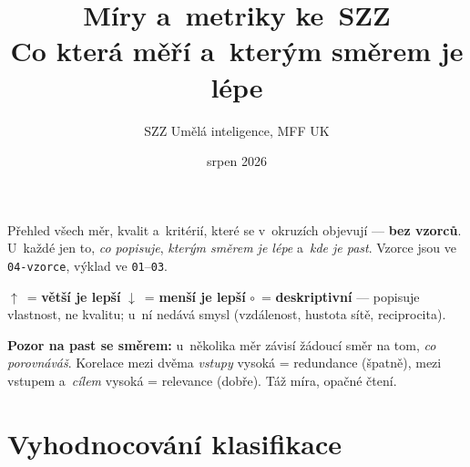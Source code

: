 \documentclass[11pt,a4paper]{article}
\title{\textbf{Míry a~metriky ke~SZZ}\\[2mm]
\large Co která měří a~kterým směrem je lépe}
\author{SZZ Umělá inteligence, MFF UK}
\date{srpen 2026}
\newcommand{\up}{\textcolor{upcol}{$\boldsymbol{\uparrow}$}}
\newcommand{\down}{\textcolor{downcol}{$\boldsymbol{\downarrow}$}}
\newcommand{\neut}{$\circ$}
\begin{document}
\maketitle

\begin{center}
\begin{minipage}{0.93\textwidth}
\small
Přehled všech měr, kvalit a~kritérií, které se v~okruzích objevují --- \textbf{bez vzorců}.
U~každé jen to, \emph{co popisuje}, \emph{kterým směrem je lépe} a~\emph{kde je past}.
Vzorce jsou ve \texttt{04-vzorce}, výklad ve \texttt{01}--\texttt{03}.
\end{minipage}
\end{center}

\begin{center}
\begin{minipage}{0.93\textwidth}
\begin{poznbox}
\small
\up~= \textbf{větší je lepší} \quad\textbullet\quad
\down~= \textbf{menší je lepší} \quad\textbullet\quad
\neut~= \textbf{deskriptivní} --- popisuje vlastnost, ne kvalitu;  u~ní nedává
smysl (vzdálenost, hustota sítě, reciprocita).

\textbf{Pozor na past se směrem:} u~několika měr závisí žádoucí směr na tom, \emph{co
porovnáváš}. Korelace mezi dvěma \emph{vstupy} vysoká = redundance (špatně), mezi vstupem
a~\emph{cílem} vysoká = relevance (dobře). Táž míra, opačné čtení.
\end{poznbox}
\end{minipage}
\end{center}

\tableofcontents

\section{Vyhodnocování klasifikace}
\end{document}
